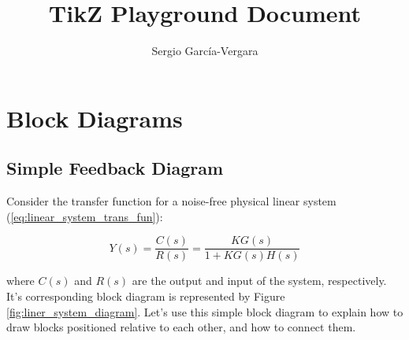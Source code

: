 \documentclass[11pt]{article}
\begin{document}

\title{TikZ Playground Document}
\author{
  Sergio Garc\'{i}a-Vergara \\
}

\maketitle






\section{Block Diagrams}

\subsection{Simple Feedback Diagram}

Consider the transfer function for a noise-free physical linear system
(\ref{eq:linear_system_trans_fun}):

\begin{equation}\label{eq:linear_system_trans_fun}
Y(s) = \frac{C(s)}{R(s)} = \frac{KG(s)}{1 + KG(s)H(s)}
\end{equation}

\noindent
where $C(s)$ and $R(s)$ are the output and input of the system,
respectively. It's corresponding block diagram is represented by Figure
\ref{fig:liner_system_diagram}. Let's use this simple block diagram to explain
how to draw blocks positioned relative to each other, and how to connect them.
\end{document}
